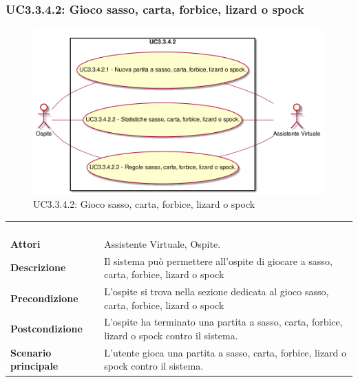 \newpage\subsubsection{UC3.3.4.2: Gioco sasso, carta, forbice, lizard o spock}
\label{UC3.3.4.2}
\begin{figure}[h]
	\centering
	\includegraphics[width=\textwidth,height=\textheight,keepaspectratio]{images/UseCaseUC3342.png}
	\caption{UC3.3.4.2: Gioco sasso, carta, forbice, lizard o spock}
\end{figure}
\begin{longtable}{l|p{10cm}}
	\rowcolor[gray]{0.8} \multicolumn{2}{c}{} \\
	\rowcolor[gray]{0.8} \multicolumn{2}{c}{\textbf{UC3.3.4.2 - Gioco sasso, carta, forbice, lizard o spock}} \\
	\rowcolor[gray]{0.8} \multicolumn{2}{c}{} \\
	\hline
	&\\
	\textbf{Attori} & Assistente Virtuale, Ospite.\\[7pt]
	\textbf{Descrizione} & Il sistema può permettere all'ospite di giocare a  sasso, carta, forbice, lizard o spock\\[7pt]
	\textbf{Precondizione} & L'ospite si trova nella sezione dedicata al gioco sasso, carta, forbice, lizard o spock\\[7pt]
	\textbf{Postcondizione} & L'ospite ha terminato una partita a sasso, carta, forbice, lizard o spock contro il sistema.\\[7pt]
	\textbf{Scenario principale} &L'utente gioca una partita a sasso, carta, forbice, lizard o spock contro il sistema.\\[7pt]\hline
\end{longtable}

